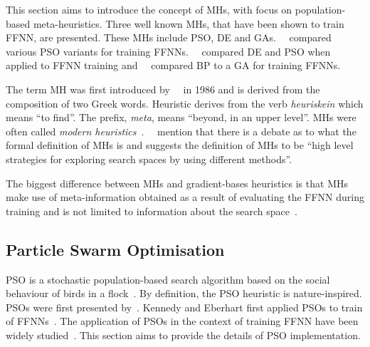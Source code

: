 This section aims to introduce the concept of \acp{MH}, with focus on population-based meta-heuristics. Three well known \acp{MH}, that have been shown to train \acs{FFNN}, are presented. These \acp{MH} include \acf{PSO}, \acf{DE} and \acfp{GA}.~\citeauthor{ref:carvalho:2006}~\cite{ref:carvalho:2006} compared various \acs{PSO} variants for training \acp{FFNN}.~\citeauthor{ref:espinal:2011}~\cite{ref:espinal:2011} compared \acs{DE} and \acs{PSO} when applied to \acs{FFNN} training and~\citeauthor{ref:gupta:1999}~\cite{ref:gupta:1999} compared \acs{BP} to a \acs{GA} for training \acp{FFNN}.

The term \acf{MH} was first introduced by~\citeauthor{ref:glover:1986}~\cite{ref:glover:1986} in 1986 and is derived from the composition of two Greek words. Heuristic derives from the verb \textit{heuriskein} which means ``to find''. The prefix, \textit{meta}, means ``beyond, in an upper level''. \Acp{MH} were often called \textit{modern heuristics}~\cite{ref:reeves:1993}.~\citeauthor{ref:blum:2003}~\cite{ref:blum:2003} mention that there is a debate as to what the formal definition of \acp{MH} is and suggests the definition of \acp{MH} to be ``high level strategies for exploring search spaces by using different methods''.

The biggest difference between \acp{MH} and gradient-bases heuristics is that
\acp{MH} make use of meta-information obtained as a result of evaluating the \acs{FFNN} during training and is not limited to information about the search space~\cite{ref:blum:2003}.


\subsection{Particle Swarm Optimisation}\label{sec:heuristics:mh:pso}

\Acf{PSO} is a stochastic population-based search algorithm based on the social behaviour of birds in a flock~\cite{ref:kennedy:1995}. By definition, the \acs{PSO} heuristic is nature-inspired.  \Acp{PSO} were first presented  by~\citeauthor{ref:kennedy:1995}\cite{ref:kennedy:1995}. Kennedy and Eberhart first applied \acp{PSO} to train of \acp{FFNN}~\cite{ref:eberhart:1995, ref:kennedy:1997}. The application of \acp{PSO} in the context of training \acs{FFNN} have been widely studied~\cite{ref:rakitianskaia:2012, ref:vanwyk:2014}. This section aims to provide the details of \acs{PSO} implementation.

